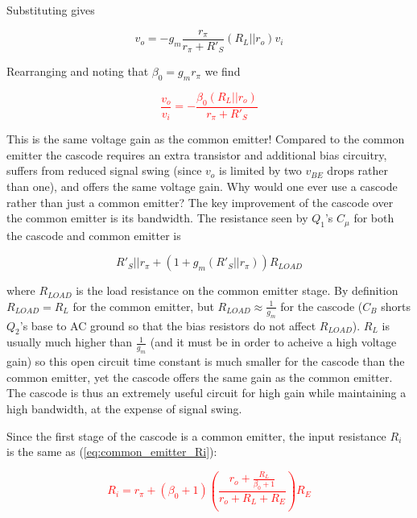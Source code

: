 \noindent Substituting gives

\begin{equation}
v_{o} = -g_{m}\frac{r_{\pi}}{r_{\pi}+ R'_{S}}(R_{L}||r_{o})v_{i}
\end{equation}

\noindent Rearranging and noting that $\beta_{0} = g_{m}r_{\pi}$ we find

\textcolor{red}{
\begin{equation}
\frac{v_{o}}{v_{i}} = -\frac{\beta_{0} (R_{L}||r_{o})}{r_{\pi}+ R'_{S}}
\end{equation}
}

\par
This is the same voltage gain as the common emitter! Compared to the common emitter the cascode requires an extra transistor and additional bias circuitry, suffers from reduced signal swing (since $v_{o}$ is limited by two $v_{BE}$ drops rather than one), and offers the same voltage gain. Why would one ever use a cascode rather than just a common emitter? The key improvement of the cascode over the common emitter is its bandwidth. The resistance seen by $Q_{1}$'s $C_{\mu}$ for both the cascode and common emitter is

\begin{equation}
R'_{S}||r_{\pi} + (1 + g_{m}(R'_{S}||r_{\pi}))R_{LOAD}
\end{equation}

where $R_{LOAD}$ is the load resistance on the common emitter stage. By definition $R_{LOAD} = R_{L}$ for the common emitter, but $R_{LOAD} \approx \frac{1}{g_{m}}$ for the cascode ($C_{B}$ shorts $Q_{2}$'s base to AC ground so that the bias resistors do not affect $R_{LOAD}$). $R_{L}$ is usually much higher than $\frac{1}{g_{m}}$ (and it must be in order to acheive a high voltage gain) so this open circuit time constant is much smaller for the cascode than the common emitter, yet the cascode offers the same gain as the common emitter. The cascode is thus an extremely useful circuit for high gain while maintaining a high bandwidth, at the expense of signal swing.

\par
Since the first stage of the cascode is a common emitter, the input resistance $R_{i}$ is the same as (\ref{eq:common_emitter_Ri}):

\textcolor{red}{
\begin{equation}
R_{i} = r_{\pi} + (\beta_{0}+1)\left(\frac{r_{o} + \frac{R_{L}}{\beta_{0}+1}}{r_{o} + R_{L} + R_{E}}\right)R_{E}
\label{eq:cascode_Ri}
\end{equation}
}

